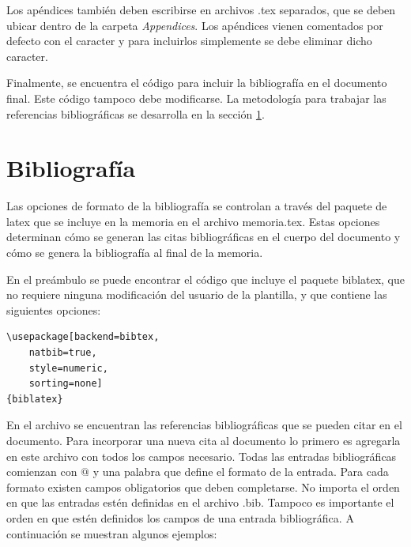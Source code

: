 \begin{verbatim}
	
	 
	
	 
	 
\end{verbatim}

Los apéndices también deben escribirse en archivos .tex separados, que se deben
ubicar dentro de la carpeta \emph{Appendices}. Los apéndices vienen comentados
por defecto con el caracter \code{\%} y para incluirlos simplemente se debe
eliminar dicho caracter.

Finalmente, se encuentra el código para incluir la bibliografía en el documento
final. Este código tampoco debe modificarse. La metodología para trabajar las
referencias bibliográficas se desarrolla en la sección \ref{sec:biblio}.

\section{Bibliografía}
\label{sec:biblio}

Las opciones de formato de la bibliografía se controlan a través del paquete de
latex  que se incluye en la memoria en el archivo memoria.tex.
Estas opciones determinan cómo se generan las citas bibliográficas en el cuerpo
del documento y cómo se genera la bibliografía al final de la memoria.

En el preámbulo se puede encontrar el código que incluye el paquete biblatex,
que no requiere ninguna modificación del usuario de la plantilla, y que
contiene las siguientes opciones:

\begin{lstlisting}
\usepackage[backend=bibtex,
	natbib=true, 
	style=numeric, 
	sorting=none]
{biblatex}
\end{lstlisting}

En el archivo  se encuentran las referencias bibliográficas
que se pueden citar en el documento. Para incorporar una nueva cita al
documento lo primero es agregarla en este archivo con todos los campos
necesario. Todas las entradas bibliográficas comienzan con $@$ y una palabra
que define el formato de la entrada. Para cada formato existen campos
obligatorios que deben completarse. No importa el orden en que las entradas
estén definidas en el archivo .bib. Tampoco es importante el orden en que estén
definidos los campos de una entrada bibliográfica. A continuación se muestran
algunos ejemplos:

